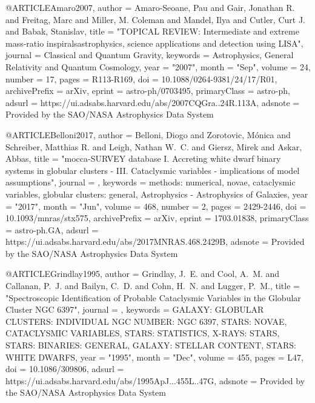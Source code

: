 \documentclass[twocolumn,tighten]{aastex63}
\begin{document}
@ARTICLE{Amaro2007,
       author = {{Amaro-Seoane}, Pau and {Gair}, Jonathan R. and {Freitag}, Marc and
         {Miller}, M. Coleman and {Mandel}, Ilya and {Cutler}, Curt J. and
         {Babak}, Stanislav},
        title = "{TOPICAL REVIEW: Intermediate and extreme mass-ratio inspirals{\textemdash}astrophysics, science applications and detection using LISA}",
      journal = {Classical and Quantum Gravity},
     keywords = {Astrophysics, General Relativity and Quantum Cosmology},
         year = "2007",
        month = "Sep",
       volume = {24},
       number = {17},
        pages = {R113-R169},
          doi = {10.1088/0264-9381/24/17/R01},
archivePrefix = {arXiv},
       eprint = {astro-ph/0703495},
 primaryClass = {astro-ph},
       adsurl = {https://ui.adsabs.harvard.edu/abs/2007CQGra..24R.113A},
      adsnote = {Provided by the SAO/NASA Astrophysics Data System}
}

@ARTICLE{Belloni2017,
       author = {{Belloni}, Diogo and {Zorotovic}, M{\'o}nica and
         {Schreiber}, Matthias R. and {Leigh}, Nathan W.~C. and {Giersz}, Mirek and
         {Askar}, Abbas},
        title = "{mocca-SURVEY database I. Accreting white dwarf binary systems in globular clusters - III. Cataclysmic variables - implications of model assumptions}",
      journal = {\mnras},
     keywords = {methods: numerical, novae, cataclysmic variables, globular clusters: general, Astrophysics - Astrophysics of Galaxies},
         year = "2017",
        month = "Jun",
       volume = {468},
       number = {2},
        pages = {2429-2446},
          doi = {10.1093/mnras/stx575},
archivePrefix = {arXiv},
       eprint = {1703.01838},
 primaryClass = {astro-ph.GA},
       adsurl = {https://ui.adsabs.harvard.edu/abs/2017MNRAS.468.2429B},
      adsnote = {Provided by the SAO/NASA Astrophysics Data System}
}

@ARTICLE{Grindlay1995,
       author = {{Grindlay}, J.~E. and {Cool}, A.~M. and {Callanan}, P.~J. and
         {Bailyn}, C.~D. and {Cohn}, H.~N. and {Lugger}, P.~M.},
        title = "{Spectroscopic Identification of Probable Cataclysmic Variables in the Globular Cluster NGC 6397}",
      journal = {\apjl},
     keywords = {GALAXY: GLOBULAR CLUSTERS: INDIVIDUAL NGC NUMBER: NGC 6397, STARS: NOVAE, CATACLYSMIC VARIABLES, STARS: STATISTICS, X-RAYS: STARS, STARS: BINARIES: GENERAL, GALAXY: STELLAR CONTENT, STARS: WHITE DWARFS},
         year = "1995",
        month = "Dec",
       volume = {455},
        pages = {L47},
          doi = {10.1086/309806},
       adsurl = {https://ui.adsabs.harvard.edu/abs/1995ApJ...455L..47G},
      adsnote = {Provided by the SAO/NASA Astrophysics Data System}
}
\end{document}
